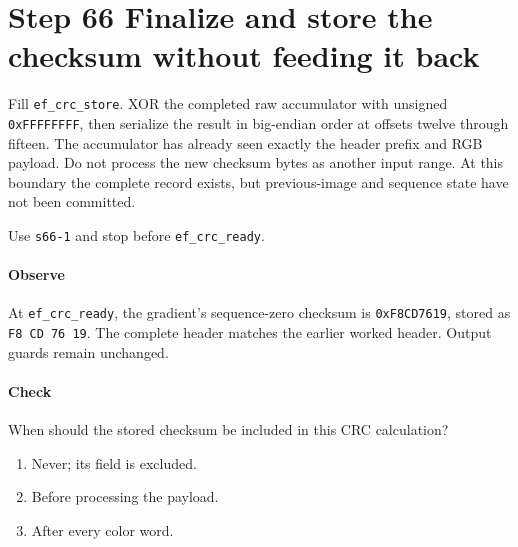 \section{Step 66 Finalize and store the checksum without feeding it back}
Fill \texttt{ef\_crc\_store}. XOR the completed raw accumulator with unsigned \texttt{0xFFFFFFFF}, then serialize the result in big-endian order at offsets twelve through fifteen. The accumulator has already seen exactly the header prefix and RGB payload. Do not process the new checksum bytes as another input range. At this boundary the complete record exists, but previous-image and sequence state have not been committed.

Use \texttt{s66-1} and stop before \texttt{ef\_crc\_ready}.

\paragraph{Observe} At \texttt{ef\_crc\_ready}, the gradient's sequence-zero checksum is \texttt{0xF8CD7619}, stored as \texttt{F8 CD 76 19}. The complete header matches the earlier worked header. Output guards remain unchanged.

\paragraph{Check} When should the stored checksum be included in this CRC calculation?
\begin{enumerate}[label=\Alph*.]
  \item Never; its field is excluded.
  \item Before processing the payload.
  \item After every color word.
\end{enumerate}
